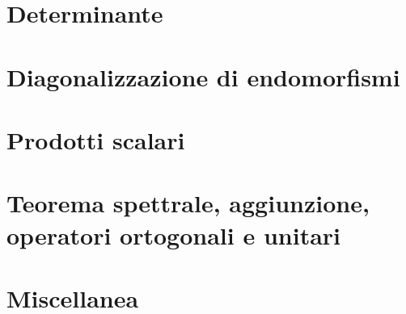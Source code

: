\documentclass[9pt, a4paper]{article}
\theoremstyle{mythm}
\begin{document}
\clearpage

\section{Determinante}


\clearpage

\section{Diagonalizzazione di endomorfismi}



\clearpage

\section{Prodotti scalari}



\clearpage

\section{Teorema spettrale, aggiunzione, operatori ortogonali e unitari}


\clearpage

\section{Miscellanea}

\end{document}
